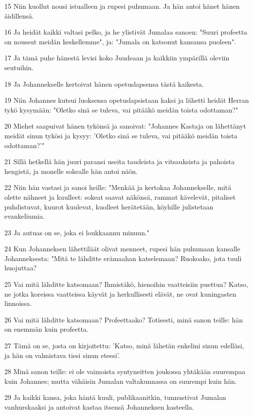 \par 15 Niin kuollut nousi istualleen ja rupesi puhumaan. Ja hän antoi hänet hänen äidillensä.
\par 16 Ja heidät kaikki valtasi pelko, ja he ylistivät Jumalaa sanoen: "Suuri profeetta on noussut meidän keskellemme", ja: "Jumala on katsonut kansansa puoleen".
\par 17 Ja tämä puhe hänestä levisi koko Juudeaan ja kaikkiin ympärillä oleviin seutuihin.
\par 18 Ja Johannekselle kertoivat hänen opetuslapsensa tästä kaikesta.
\par 19 Niin Johannes kutsui luoksensa opetuslapsistaan kaksi ja lähetti heidät Herran tykö kysymään: "Oletko sinä se tuleva, vai pitääkö meidän toista odottaman?"
\par 20 Miehet saapuivat hänen tykönsä ja sanoivat: "Johannes Kastaja on lähettänyt meidät sinun tykösi ja kysyy: 'Oletko sinä se tuleva, vai pitääkö meidän toista odottaman?'"
\par 21 Sillä hetkellä hän juuri paransi useita taudeista ja vitsauksista ja pahoista hengistä, ja monelle sokealle hän antoi näön.
\par 22 Niin hän vastasi ja sanoi heille: "Menkää ja kertokaa Johannekselle, mitä olette nähneet ja kuulleet: sokeat saavat näkönsä, rammat kävelevät, pitaliset puhdistuvat, kuurot kuulevat, kuolleet herätetään, köyhille julistetaan evankeliumia.
\par 23 Ja autuas on se, joka ei loukkaannu minuun."
\par 24 Kun Johanneksen lähettiläät olivat menneet, rupesi hän puhumaan kansalle Johanneksesta: "Mitä te lähditte erämaahan katselemaan? Ruokoako, jota tuuli huojuttaa?
\par 25 Vai mitä lähditte katsomaan? Ihmistäkö, hienoihin vaatteisiin puettua? Katso, ne jotka koreissa vaatteissa käyvät ja herkullisesti elävät, ne ovat kuningasten linnoissa.
\par 26 Vai mitä lähditte katsomaan? Profeettaako? Totisesti, minä sanon teille: hän on enemmän kuin profeetta.
\par 27 Tämä on se, josta on kirjoitettu: 'Katso, minä lähetän enkelini sinun edelläsi, ja hän on valmistava tiesi sinun eteesi'.
\par 28 Minä sanon teille: ei ole vaimoista syntyneitten joukossa yhtäkään suurempaa kuin Johannes; mutta vähäisin Jumalan valtakunnassa on suurempi kuin hän.
\par 29 Ja kaikki kansa, joka häntä kuuli, publikaanitkin, tunnustivat Jumalan vanhurskaaksi ja antoivat kastaa itsensä Johanneksen kasteella.
